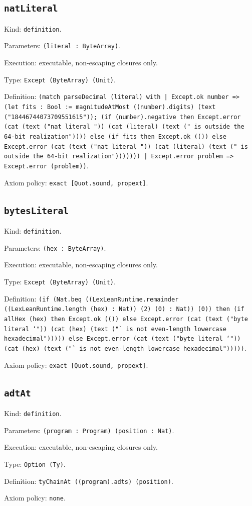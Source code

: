 \documentclass[11pt]{article}
\begin{document}
\subsection*{\texttt{natLiteral}}
\noindent Kind: \texttt{definition}.\par
\noindent Parameters: \texttt{(literal : ByteArray)}.\par
\noindent Execution: executable, non-escaping closures only.\par
\noindent Type: \texttt{Except (ByteArray) (Unit)}.\par
\noindent Definition: \texttt{(match parseDecimal (literal) with | Except.ok number => (let fits : Bool := magnitudeAtMost ((number).digits) (text ("18446744073709551615")); (if (number).negative then Except.error (cat (text ("nat literal ")) (cat (literal) (text (" is outside the 64-bit realization")))) else (if fits then Except.ok (()) else Except.error (cat (text ("nat literal ")) (cat (literal) (text (" is outside the 64-bit realization"))))))) | Except.error problem => Except.error (problem))}.\par
\noindent Axiom policy: \texttt{exact [Quot.sound, propext]}.\par
\subsection*{\texttt{bytesLiteral}}
\noindent Kind: \texttt{definition}.\par
\noindent Parameters: \texttt{(hex : ByteArray)}.\par
\noindent Execution: executable, non-escaping closures only.\par
\noindent Type: \texttt{Except (ByteArray) (Unit)}.\par
\noindent Definition: \texttt{(if (Nat.beq ((LexLeanRuntime.remainder ((LexLeanRuntime.length (hex) : Nat)) (2) (0) : Nat)) (0)) then (if allHex (hex) then Except.ok (()) else Except.error (cat (text ("byte literal `")) (cat (hex) (text ("` is not even-length lowercase hexadecimal"))))) else Except.error (cat (text ("byte literal `")) (cat (hex) (text ("` is not even-length lowercase hexadecimal")))))}.\par
\noindent Axiom policy: \texttt{exact [Quot.sound, propext]}.\par
\subsection*{\texttt{adtAt}}
\noindent Kind: \texttt{definition}.\par
\noindent Parameters: \texttt{(program : Program) (position : Nat)}.\par
\noindent Execution: executable, non-escaping closures only.\par
\noindent Type: \texttt{Option (Ty)}.\par
\noindent Definition: \texttt{tyChainAt ((program).adts) (position)}.\par
\noindent Axiom policy: \texttt{none}.\par
\end{document}

